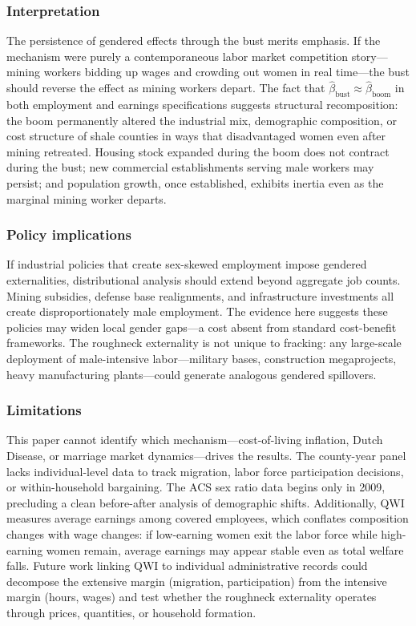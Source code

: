 \documentclass[12pt]{article}
\begin{document}
\subsubsection*{Interpretation} The persistence of gendered effects through the bust merits emphasis. If the mechanism were purely a contemporaneous labor market competition story---mining workers bidding up wages and crowding out women in real time---the bust should reverse the effect as mining workers depart. The fact that $\hat{\beta}_{\text{bust}} \approx \hat{\beta}_{\text{boom}}$ in both employment and earnings specifications suggests structural recomposition: the boom permanently altered the industrial mix, demographic composition, or cost structure of shale counties in ways that disadvantaged women even after mining retreated. Housing stock expanded during the boom does not contract during the bust; new commercial establishments serving male workers may persist; and population growth, once established, exhibits inertia even as the marginal mining worker departs.

\subsubsection*{Policy implications} If industrial policies that create sex-skewed employment impose gendered externalities, distributional analysis should extend beyond aggregate job counts. Mining subsidies, defense base realignments, and infrastructure investments all create disproportionately male employment. The evidence here suggests these policies may widen local gender gaps---a cost absent from standard cost-benefit frameworks. The roughneck externality is not unique to fracking: any large-scale deployment of male-intensive labor---military bases, construction megaprojects, heavy manufacturing plants---could generate analogous gendered spillovers.

\subsubsection*{Limitations} This paper cannot identify which mechanism---cost-of-living inflation, Dutch Disease, or marriage market dynamics---drives the results. The county-year panel lacks individual-level data to track migration, labor force participation decisions, or within-household bargaining. The ACS sex ratio data begins only in 2009, precluding a clean before-after analysis of demographic shifts. Additionally, QWI measures average earnings among covered employees, which conflates composition changes with wage changes: if low-earning women exit the labor force while high-earning women remain, average earnings may appear stable even as total welfare falls. Future work linking QWI to individual administrative records could decompose the extensive margin (migration, participation) from the intensive margin (hours, wages) and test whether the roughneck externality operates through prices, quantities, or household formation.
\end{document}
